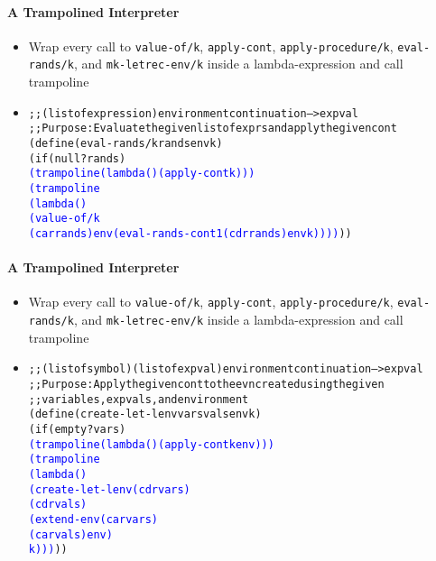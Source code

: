 \documentclass{beamer}
\newcommand{\elist}{\texttt{\textquotesingle{()}}}
\begin{document}
\begin{frame}[fragile]
\framesubtitle{A Trampolined Interpreter}
\begin{scriptsize}
\begin{itemize}
\item<1-> Wrap every call to \texttt{value-of/k}, \texttt{apply-cont}, \texttt{apply-procedure/k}, \texttt{eval-rands/k}, and \texttt{mk-letrec-env/k} inside a lambda-expression and call trampoline

\item<1->
\begin{alltt}
;; (listof expression) environment continuation --> expval
;; Purpose: Evaluate the given list of exprs and apply the given cont
(define (eval-rands/k rands env k)
  (if (null? rands)
      \textcolor{blue}{(trampoline (lambda () (apply-cont k \elist{})))}
      \textcolor{blue}{(trampoline 
       (lambda () 
        (value-of/k 
         (car rands) env (eval-rands-cont1 (cdr rands) env k))))}))
\end{alltt}

\end{itemize}
\end{scriptsize}
\end{frame}

\begin{frame}[fragile]
\framesubtitle{A Trampolined Interpreter}
\begin{scriptsize}
\begin{itemize}
\item<1-> Wrap every call to \texttt{value-of/k}, \texttt{apply-cont}, \texttt{apply-procedure/k}, \texttt{eval-rands/k}, and \texttt{mk-letrec-env/k} inside a lambda-expression and call trampoline

\item<1->
\begin{alltt}
;; (listof symbol) (listof expval) environment continuation --> expval
;; Purpose: Apply the given cont to the evn created usingthe given
;;          variables, expvals, and environment
(define (create-let-lenv vars vals env k)
  (if (empty? vars)
      \textcolor{blue}{(trampoline (lambda () (apply-cont k env)))}
      \textcolor{blue}{(trampoline 
       (lambda () 
        (create-let-lenv (cdr vars)
                         (cdr vals)
                         (extend-env (car vars) 
                                     (car vals) env)
                         k)))}))
\end{alltt}

\end{itemize}
\end{scriptsize}
\end{frame}
\end{document}
